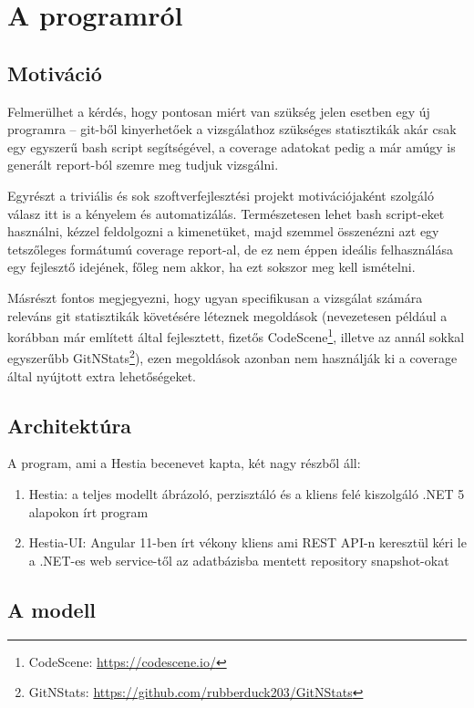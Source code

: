 \chapter{A programról}
\label{ch:about_hestia}

\section{Motiváció}

Felmerülhet a kérdés, hogy pontosan miért van szükség jelen esetben egy új programra -- git-ből kinyerhetőek a vizsgálathoz szükséges statisztikák akár csak egy egyszerű bash script segítségével, a coverage adatokat pedig a már amúgy is generált report-ból szemre meg tudjuk vizsgálni.

Egyrészt a triviális és sok szoftverfejlesztési projekt motivációjaként szolgáló válasz itt is a kényelem és automatizálás. Természetesen lehet bash script-eket használni, kézzel feldolgozni a kimenetüket, majd szemmel összenézni azt egy tetszőleges formátumú coverage report-al, de ez nem éppen ideális felhasználása egy fejlesztő idejének, főleg nem akkor, ha ezt sokszor meg kell ismételni.

Másrészt fontos megjegyezni, hogy ugyan specifikusan a vizsgálat számára releváns git statisztikák követésére léteznek megoldások (nevezetesen például a korábban már említett \citeauthor{tornhillXrays} által fejlesztett, fizetős CodeScene\footnote{CodeScene: \url{https://codescene.io/}}, illetve az annál sokkal egyszerűbb GitNStats\footnote{GitNStats: \url{https://github.com/rubberduck203/GitNStats}}), ezen megoldások azonban nem használják ki a coverage által nyújtott extra lehetőségeket.

\section{Architektúra}

A program, ami a Hestia becenevet kapta, két nagy részből áll:
\begin{enumerate}
    \item Hestia: a teljes modellt ábrázoló, perzisztáló és a kliens felé kiszolgáló .NET 5 alapokon írt program
    \item Hestia-UI: Angular 11-ben írt vékony kliens ami REST API-n keresztül kéri le a .NET-es web service-től az adatbázisba mentett repository snapshot-okat
\end{enumerate}

\section{A modell}

